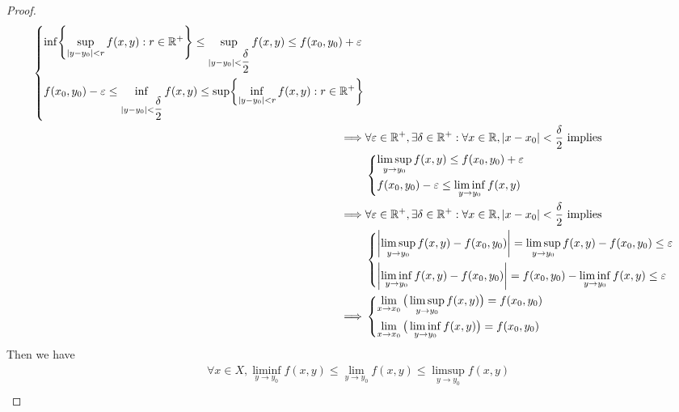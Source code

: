 \begin{proof}
\begin{align*}
\begin{dcases}
                 \inf\set{\sup_{\abs{y - y_0} < r} f(x, y) : r \in \R^+} \leq \sup_{\abs{y - y_0} < \dfrac{\delta}{2}} f(x, y) \leq f(x_0, y_0) + \varepsilon \\
                 f(x_0, y_0) - \varepsilon \leq \inf_{\abs{y - y_0} < \dfrac{\delta}{2}} f(x, y) \leq \sup\set{\inf_{\abs{y - y_0} < r} f(x, y) : r \in \R^+}
               \end{dcases}    \\
    \implies & \forall \varepsilon \in \R^+, \exists \delta \in \R^+ : \forall x \in \R, \abs{x - x_0} < \dfrac{\delta}{2} \text{ implies}                                          \\
             & \begin{dcases}
                 \limsup_{y \to y_0} f(x, y) \leq f(x_0, y_0) + \varepsilon \\
                 f(x_0, y_0) - \varepsilon \leq \liminf_{y \to y_0} f(x, y)
               \end{dcases}                                                                                                           \\
    \implies & \forall \varepsilon \in \R^+, \exists \delta \in \R^+ : \forall x \in \R, \abs{x - x_0} < \dfrac{\delta}{2} \text{ implies}                                          \\
             & \begin{dcases}
                 \abs{\limsup_{y \to y_0} f(x, y) - f(x_0, y_0)} = \limsup_{y \to y_0} f(x, y) - f(x_0, y_0) \leq \varepsilon \\
                 \abs{\liminf_{y \to y_0} f(x, y) - f(x_0, y_0)} = f(x_0, y_0) - \liminf_{y \to y_0} f(x, y) \leq \varepsilon
               \end{dcases}                                                   \\
    \implies & \begin{dcases}
                 \lim_{x \to x_0} \big(\limsup_{y \to y_0} f(x, y)\big) = f(x_0, y_0) \\
                 \lim_{x \to x_0} \big(\liminf_{y \to y_0} f(x, y)\big) = f(x_0, y_0)
               \end{dcases}
  \end{align*}
  Then we have
  \begin{align*}
             & \forall x \in X, \liminf_{y \to y_0} f(x, y) \leq \lim_{y \to y_0} f(x, y) \leq \limsup_{y \to y_0} f(x, y)                              \\

\end{align*}
\end{proof}
